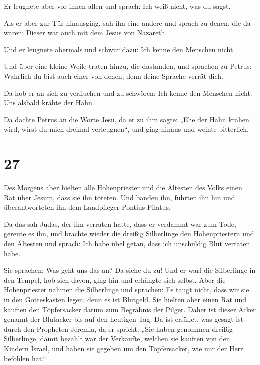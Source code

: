  Er leugnete aber vor ihnen allen und sprach: Ich weiß
nicht, was du sagst.

 Als er aber zur Tür hinausging, sah ihn eine andere und
sprach zu denen, die da waren: Dieser war auch mit dem Jesus von
Nazareth.

 Und er leugnete abermals und schwur dazu: Ich kenne den
Menschen nicht.

 Und über eine kleine Weile traten hinzu, die dastanden,
und sprachen zu Petrus: Wahrlich du bist auch einer von denen; denn
deine Sprache verrät dich.

 Da hob er an sich zu verfluchen und zu schwören: Ich
kenne den Menschen nicht. Uns alsbald krähte der Hahn.

 Da dachte Petrus an die Worte Jesu, da er zu ihm sagte:
„Ehe der Hahn krähen wird, wirst du mich dreimal verleugnen``, und ging
hinaus und weinte bitterlich.

\hypertarget{section-26}{%
\section{27}\label{section-26}}

 Des Morgens aber hielten alle Hohenpriester und die
Ältesten des Volks einen Rat über Jesum, dass sie ihn töteten.
 Und banden ihn, führten ihn hin und überantworteten ihn
dem Landpfleger Pontius Pilatus.

 Da das sah Judas, der ihn verraten hatte, dass er
verdammt war zum Tode, gereute es ihn, und brachte wieder die dreißig
Silberlinge den Hohenpriestern und den Ältesten  und
sprach: Ich habe übel getan, dass ich unschuldig Blut verraten habe.

 Sie sprachen: Was geht uns das an? Da siehe du zu! Und er
warf die Silberlinge in den Tempel, hob sich davon, ging hin und
erhängte sich selbst.  Aber die Hohenpriester nahmen die
Silberlinge und sprachen: Es taugt nicht, dass wir sie in den
Gotteskasten legen; denn es ist Blutgeld.  Sie hielten
aber einen Rat und kauften den Töpfersacker darum zum Begräbnis der
Pilger.  Daher ist dieser Acker genannt der Blutacker bis
auf den heutigen Tag.  Da ist erfüllet, was gesagt ist
durch den Propheten Jeremia, da er spricht: „Sie haben genommen dreißig
Silberlinge, damit bezahlt war der Verkaufte, welchen sie kauften von
den Kindern Israel,  und haben sie gegeben um den
Töpfersacker, wie mir der Herr befohlen hat.``

